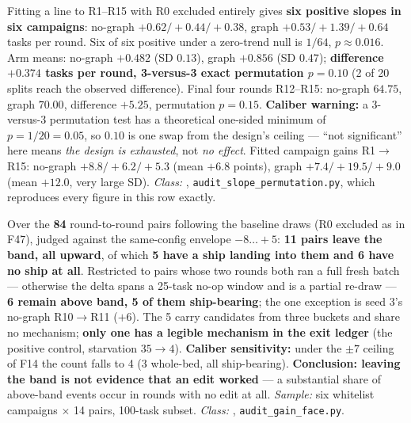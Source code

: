 \begin{description}[leftmargin=0pt,style=nextline,font=\normalfont,itemsep=6pt]
\item[\textbf{F47}\quad Within-campaign trend --- both arms climb.]
Fitting a line to R1--R15 with R0 excluded entirely gives \textbf{six
positive slopes in six campaigns}: no-graph $+0.62 / +0.44 / +0.38$, graph
$+0.53 / +1.39 / +0.64$ tasks per round. Six of six positive under a
zero-trend null is $1/64$, $p \approx 0.016$. Arm means: no-graph $+0.482$
(SD $0.13$), graph $+0.856$ (SD $0.47$); \textbf{difference $+0.374$ tasks
per round, 3-versus-3 exact permutation $p = 0.10$} (2 of 20 splits reach
the observed difference). Final four rounds R12--R15: no-graph $64.75$,
graph $70.00$, difference $+5.25$, permutation $p = 0.15$.
\textbf{Caliber warning:} a 3-versus-3 permutation test has a theoretical
one-sided minimum of $p = 1/20 = 0.05$, so $0.10$ is one swap from the
design's ceiling --- ``not significant'' here means \emph{the design is
exhausted}, not \emph{no effect}. Fitted campaign gains R1$\to$R15:
no-graph $+8.8/+6.2/+5.3$ (mean $+6.8$ points), graph $+7.4/+19.5/+9.0$
(mean $+12.0$, very large SD). \emph{Class:} , \texttt{audit\_slope\_permutation.py}, which
reproduces every figure in this row exactly.

\item[\textbf{F48}\quad The gain face --- above-band moves across all six
      campaigns.]
Over the \textbf{84} round-to-round pairs following the baseline draws (R0
excluded as in F47), judged against the same-config envelope
$-8\ldots{+}5$: \textbf{11 pairs leave the band, all upward}, of which
\textbf{5 have a ship landing into them and 6 have no ship at all}.
Restricted to pairs whose two rounds both ran a full fresh batch ---
otherwise the delta spans a 25-task no-op window and is a partial re-draw
--- \textbf{6 remain above band, 5 of them ship-bearing}; the one
exception is seed 3's no-graph R10$\to$R11 ($+6$). The 5 carry candidates
from three buckets and share no mechanism; \textbf{only one has a legible
mechanism in the exit ledger} (the positive control, starvation $35 \to 4$).
\textbf{Caliber sensitivity:} under the $\pm 7$ ceiling of F14 the count
falls to 4 (3 whole-bed, all ship-bearing).
\textbf{Conclusion: leaving the band is not evidence that an edit worked}
--- a substantial share of above-band events occur in rounds with no edit
at all. \emph{Sample:} six whitelist campaigns $\times$ 14 pairs, 100-task
subset. \emph{Class:} , \texttt{audit\_gain\_face.py}.


\end{description}
